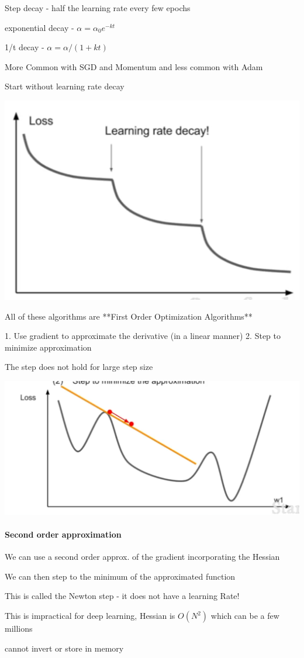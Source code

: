 Step decay - half the learning rate every few epochs

exponential decay - $\alpha = \alpha_0e^{-kt}$ 

1/t decay - $\alpha = \alpha / (1+kt) $ 

More Common with SGD and Momentum and less common with Adam

Start without learning rate decay

\includegraphics[width=0.5\columnwidth]{fei_fei_li/lecture_07/learning_rate_decay.png}

All of these algorithms are **First Order Optimization Algorithms**

1. Use gradient to approximate the derivative (in a linear manner)
2. Step to minimize approximation

The step does not hold for large step size

\includegraphics[width=0.5\columnwidth]{fei_fei_li/lecture_07/first_order_approx.png}

\paragraph{Second order approximation}

We can use a second order approx. of the gradient incorporating the Hessian

We can then step to the minimum of the approximated function

This is called the Newton step - it does not have a learning Rate!

This is impractical for deep learning, Hessian is $O(N^2)$ which can be a few millions

cannot invert or store in memory

